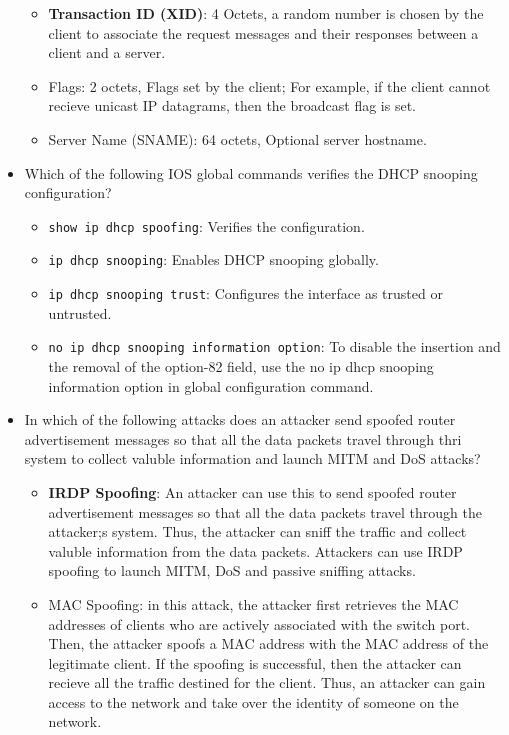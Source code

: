 \begin{itemize}
\begin{itemize}
        \item \textbf{Transaction ID (XID)}: 4 Octets, a random number is chosen by the client to associate the request messages and their responses between a client and a server.
        \item Flags: 2 octets, Flags set by the client; For example, if the client cannot recieve unicast IP datagrams, then the broadcast flag is set.
        \item Server Name (SNAME): 64 octets, Optional server hostname.
    \end{itemize}
    \item Which of the following IOS global commands verifies the DHCP snooping configuration?
    \begin{itemize}
        \item \verb|show ip dhcp spoofing|: Verifies the configuration.
        \item \verb|ip dhcp snooping|: Enables DHCP snooping globally.
        \item \verb|ip dhcp snooping trust|: Configures the interface as trusted or untrusted.
        \item \verb|no ip dhcp snooping information option|: To disable the insertion and the removal of the option-82 field, use the no ip dhcp snooping information option in global configuration command.
    \end{itemize}
    \item In which of the following attacks does an attacker send spoofed router advertisement messages so that all the data packets travel through thri system to collect valuble information and launch MITM and DoS attacks?
    \begin{itemize}
        \item \textbf{IRDP Spoofing}: An attacker can use this to send spoofed router advertisement messages so that all the data packets travel through the attacker;s system. Thus, the attacker can sniff the traffic and collect valuble information from the data packets. Attackers can use IRDP spoofing to launch MITM, DoS and passive sniffing attacks.
        \item MAC Spoofing: in this attack, the attacker first retrieves the MAC addresses of clients who are actively associated with the switch port. Then, the attacker spoofs a MAC address with the MAC address of the legitimate client. If the spoofing is successful, then the attacker can recieve all the traffic destined for the client. Thus, an attacker can gain access to the network and take over the identity of someone on the network.

\end{itemize}
\end{itemize}
